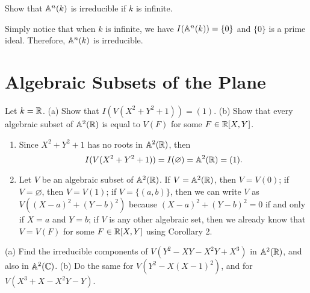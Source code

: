 \begin{exercise}
    Show that $\mathbb{A}^n(k)$ is irreducible if $k$ is infinite. \\
\end{exercise}

\begin{solution}
    Simply notice that when $k$ is infinite, we have $I(\mathbb{A}^n(k)) = \{0\}$ and $\{0\}$ is a prime ideal. Therefore, $\mathbb{A}^n(k)$ is irreducible. \\
\end{solution}

\section{Algebraic Subsets of the Plane}

\begin{exercise}
    Let $k = \mathbb{R}$. (a) Show that $I(V(X^2 + Y^2 + 1)) = (1)$. (b) Show that every algebraic subset of $\mathbb{A}^2(\mathbb{R})$ is equal to $V(F)$ for some $F \in \mathbb{R}[X,Y]$. \\
\end{exercise}

\begin{solution}
    \begin{enumerate}[label=(\alph*)]
        \item Since $X^2 + Y^2 + 1$ has no roots in $\mathbb{A}^2(\mathbb{R})$, then
        $$I(V(X^2 + Y^2 + 1)) = I(\varnothing) = \mathbb{A}^2(\mathbb{R}) = (1).$$
        \item Let $V$ be an algebraic subset of $\mathbb{A}^2(\mathbb{R})$. If $V = \mathbb{A}^2(\mathbb{R})$, then $V = V(0)$; if $V = \varnothing$, then $V = V(1)$; if $V = \{(a,b)\}$, then we can write $V$ as $V((X-a)^2 + (Y-b)^2)$ because $(X-a)^2 + (Y-b)^2 = 0$ if and only if $X = a$ and $Y = b$; if $V$ is any other algebraic set, then we already know that $V = V(F)$ for some $F \in \mathbb{R}[X,Y]$ using Corollary 2.\\
    \end{enumerate}
\end{solution}

\begin{exercise}
    (a) Find the irreducible components of $V(Y^2 - XY - X^2Y + X^3)$ in $\mathbb{A}^2(\mathbb{R})$, and also in $\mathbb{A}^2(\mathbb{C})$. (b) Do the same for $V(Y^2 - X(X-1)^2)$, and for $V(X^3 + X - X^2Y - Y)$.\\
\end{exercise}

